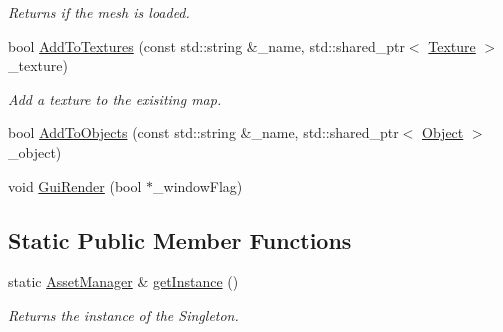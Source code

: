 \begin{DoxyCompactItemize}
\begin{DoxyCompactList}\small\item\em Returns if the mesh is loaded. \end{DoxyCompactList}\item 
bool \mbox{\hyperlink{classpiolot_1_1_asset_manager_a06b647312e18c2ca212d34211d262783}{Add\+To\+Textures}} (const std\+::string \&\+\_\+name, std\+::shared\+\_\+ptr$<$ \mbox{\hyperlink{classpiolot_1_1_texture}{Texture}} $>$ \+\_\+texture)
\begin{DoxyCompactList}\small\item\em Add a texture to the exisiting map. \end{DoxyCompactList}\item 
bool \mbox{\hyperlink{classpiolot_1_1_asset_manager_abfad75fa1cde6d1ecd77fbdf297a80b0}{Add\+To\+Objects}} (const std\+::string \&\+\_\+name, std\+::shared\+\_\+ptr$<$ \mbox{\hyperlink{classpiolot_1_1_object}{Object}} $>$ \+\_\+object)
\item 
void \mbox{\hyperlink{classpiolot_1_1_asset_manager_a00d1b6635e14cfdf2a618fff3ad61416}{Gui\+Render}} (bool $\ast$\+\_\+window\+Flag)
\end{DoxyCompactItemize}
\subsection*{Static Public Member Functions}
\begin{DoxyCompactItemize}
\item 
static \mbox{\hyperlink{classpiolot_1_1_asset_manager}{Asset\+Manager}} \& \mbox{\hyperlink{classpiolot_1_1_asset_manager_a5bcfd6d2719bcada7f5865eb6e39664b}{get\+Instance}} ()
\begin{DoxyCompactList}\small\item\em Returns the instance of the Singleton. \end{DoxyCompactList}\end{DoxyCompactItemize}
